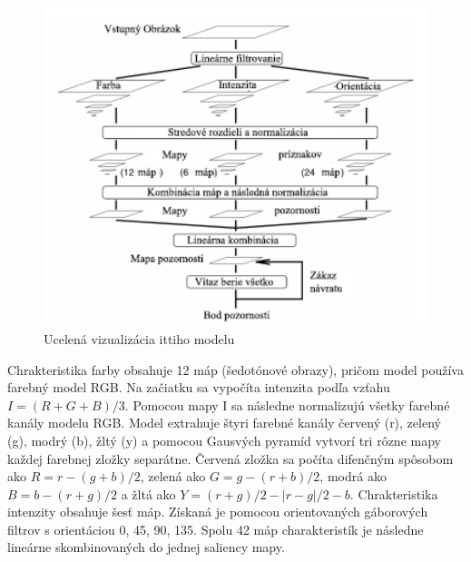 \begin{figure}[H]
 \centering
 \includegraphics[width=12cm]{pics/itti-1-svk.png}
 \caption{Ucelená vizualizácia ittiho modelu\cite{itty-98}}\label{wrap-fig:1}
\end{figure}
\vspace{10mm}

Chrakteristika farby obsahuje 12 máp (šedotónové obrazy), pričom model používa farebný model RGB.
Na začiatku sa vypočíta intenzita podľa vzťahu \begin{math} I = (R+G+B)/3\end{math}.
Pomocou mapy I sa následne normalizujú všetky farebné kanály modelu RGB.
Model extrahuje štyri farebné kanály červený (r), zelený (g), modrý (b), žltý (y) a pomocou Gausvých pyramíd vytvorí tri rôzne mapy každej farebnej zložky separátne.
Červená zložka sa počíta difenčným spôsobom ako \begin{math} R = r - (g + b)/2 \end{math}, zelená ako \begin{math} G = g - (r + b)/2 \end{math}, modrá ako \begin{math}B = b - (r + g)/2\end{math} a žltá ako \begin{math}Y = (r + g)/2 - |r - g|/2 - b\end{math}.
Chrakteristika intenzity obsahuje šesť máp.
Získaná je pomocou orientovaných gáborových filtrov s orientáciou 0\degree, 45\degree, 90\degree, 135\degree.
Spolu 42 máp charakteristík je následne lineárne skombinovaných do jednej saliency mapy\cite{itty-98}.


